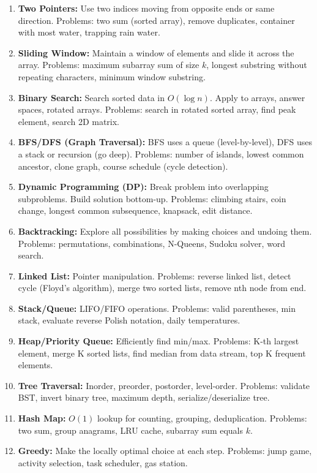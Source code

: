 \documentclass[12pt, a4paper, oneside]{book}
\begin{document}
\begin{enumerate}[leftmargin=2em]
    \item \textbf{Two Pointers:} Use two indices moving from opposite ends or same direction. Problems: two sum (sorted array), remove duplicates, container with most water, trapping rain water.

    \item \textbf{Sliding Window:} Maintain a window of elements and slide it across the array. Problems: maximum subarray sum of size $k$, longest substring without repeating characters, minimum window substring.

    \item \textbf{Binary Search:} Search sorted data in $O(\log n)$. Apply to arrays, answer spaces, rotated arrays. Problems: search in rotated sorted array, find peak element, search 2D matrix.

    \item \textbf{BFS/DFS (Graph Traversal):} BFS uses a queue (level-by-level), DFS uses a stack or recursion (go deep). Problems: number of islands, lowest common ancestor, clone graph, course schedule (cycle detection).

    \item \textbf{Dynamic Programming (DP):} Break problem into overlapping subproblems. Build solution bottom-up. Problems: climbing stairs, coin change, longest common subsequence, knapsack, edit distance.

    \item \textbf{Backtracking:} Explore all possibilities by making choices and undoing them. Problems: permutations, combinations, N-Queens, Sudoku solver, word search.

    \item \textbf{Linked List:} Pointer manipulation. Problems: reverse linked list, detect cycle (Floyd's algorithm), merge two sorted lists, remove nth node from end.

    \item \textbf{Stack/Queue:} LIFO/FIFO operations. Problems: valid parentheses, min stack, evaluate reverse Polish notation, daily temperatures.

    \item \textbf{Heap/Priority Queue:} Efficiently find min/max. Problems: K-th largest element, merge K sorted lists, find median from data stream, top K frequent elements.

    \item \textbf{Tree Traversal:} Inorder, preorder, postorder, level-order. Problems: validate BST, invert binary tree, maximum depth, serialize/deserialize tree.

    \item \textbf{Hash Map:} $O(1)$ lookup for counting, grouping, deduplication. Problems: two sum, group anagrams, LRU cache, subarray sum equals $k$.

    \item \textbf{Greedy:} Make the locally optimal choice at each step. Problems: jump game, activity selection, task scheduler, gas station.
\end{enumerate}
\end{document}
